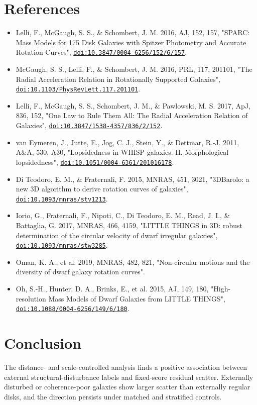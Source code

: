 \documentclass[11pt]{article}
\begin{document}
\section*{References}
\begin{itemize}
\item Lelli, F., McGaugh, S. S., \& Schombert, J. M. 2016, AJ, 152, 157, "SPARC: Mass Models for 175 Disk Galaxies with Spitzer Photometry and Accurate Rotation Curves", \href{https://doi.org/10.3847/0004-6256/152/6/157}{\nolinkurl{doi:10.3847/0004-6256/152/6/157}}.
\item McGaugh, S. S., Lelli, F., \& Schombert, J. M. 2016, PRL, 117, 201101, "The Radial Acceleration Relation in Rotationally Supported Galaxies", \href{https://doi.org/10.1103/PhysRevLett.117.201101}{\nolinkurl{doi:10.1103/PhysRevLett.117.201101}}.
\item Lelli, F., McGaugh, S. S., Schombert, J. M., \& Pawlowski, M. S. 2017, ApJ, 836, 152, "One Law to Rule Them All: The Radial Acceleration Relation of Galaxies", \href{https://doi.org/10.3847/1538-4357/836/2/152}{\nolinkurl{doi:10.3847/1538-4357/836/2/152}}.
\item van Eymeren, J., Jutte, E., Jog, C. J., Stein, Y., \& Dettmar, R.-J. 2011, A\&A, 530, A30, "Lopsidedness in WHISP galaxies. II. Morphological lopsidedness", \href{https://doi.org/10.1051/0004-6361/201016178}{\nolinkurl{doi:10.1051/0004-6361/201016178}}.
\item Di Teodoro, E. M., \& Fraternali, F. 2015, MNRAS, 451, 3021, "3DBarolo: a new 3D algorithm to derive rotation curves of galaxies", \href{https://doi.org/10.1093/mnras/stv1213}{\nolinkurl{doi:10.1093/mnras/stv1213}}.
\item Iorio, G., Fraternali, F., Nipoti, C., Di Teodoro, E. M., Read, J. I., \& Battaglia, G. 2017, MNRAS, 466, 4159, "LITTLE THINGS in 3D: robust determination of the circular velocity of dwarf irregular galaxies", \href{https://doi.org/10.1093/mnras/stw3285}{\nolinkurl{doi:10.1093/mnras/stw3285}}.
\item Oman, K. A., et al. 2019, MNRAS, 482, 821, "Non-circular motions and the diversity of dwarf galaxy rotation curves".
\item Oh, S.-H., Hunter, D. A., Brinks, E., et al. 2015, AJ, 149, 180, "High-resolution Mass Models of Dwarf Galaxies from LITTLE THINGS", \href{https://doi.org/10.1088/0004-6256/149/6/180}{\nolinkurl{doi:10.1088/0004-6256/149/6/180}}.
\end{itemize}
\section{Conclusion}
The distance- and scale-controlled analysis finds a positive association between external structural-disturbance labels and fixed-score residual scatter. Externally disturbed or coherence-poor galaxies show larger scatter than externally regular disks, and the direction persists under matched and stratified controls.
\end{document}
